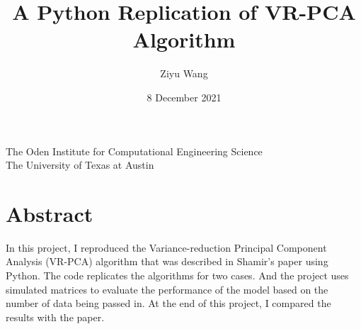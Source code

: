 \documentclass{article}
\title{\textbf{A Python Replication of VR-PCA Algorithm}}
\author{Ziyu  Wang}
\date{8 December 2021}
\begin{document}
\maketitle
\begin{center}
    The Oden Institute for Computational Engineering Science\\
    The University of Texas at Austin
\end{center}

\section{Abstract}
In this project, I reproduced the Variance-reduction Principal Component Analysis (VR-PCA) algorithm that was described in Shamir’s paper using Python. The code replicates the algorithms for two cases. And the project uses simulated matrices to evaluate the performance of the model based on the number of data being passed in. At the end of this project, I compared the results with the paper.
\end{document}
